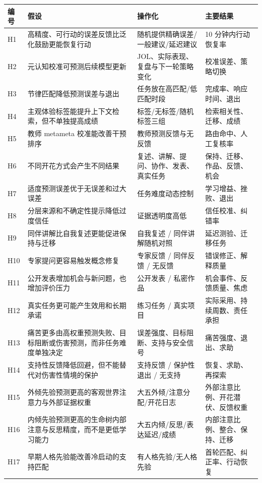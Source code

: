 \documentclass[UTF8,a4paper,11pt]{ctexart}
\begin{document}
\begin{center}
\begin{longtable}{@{}p{1.4cm}p{4.5cm}p{5.2cm}p{3.4cm}@{}}
\toprule
\textbf{编号} & \textbf{假设} & \textbf{操作化} & \textbf{主要结果} \\
\midrule
H1 & 高精度、可行动的误差反馈比泛化鼓励更能恢复行动 & 随机提供精确误差/一般建议/延迟建议 & 10 分钟内行动恢复率 \\
H2 & 元认知校准可预测后续模型更新 & JOL、实际表现、复盘与下一轮策略变化 & 校准误差、策略切换 \\
H3 & 节律匹配降低预测误差与退出 & 任务放在高匹配/低匹配时段 & 完成率、响应时间、退出 \\
H4 & 主观体验标签能提升上下文检索，但不单独提高成绩 & 标签/无标签/随机标签三组 & 检索相关性、迁移、成绩 \\
H5 & 教师 metameta 校准能改善干预排序 & 教师预测反馈与无反馈 & 路由命中、人工复核率 \\
H6 & 不同开花方式会产生不同结果 & 复述、讲解、提问、协作、发表、真实任务 & 保持、迁移、作品、反馈、机会 \\
H7 & 适度预测误差优于无误差和过大误差 & 任务难度动态控制 & 学习增益、挫败、退出 \\
H8 & 分层来源和不确定性提示降低过度信任 & 证据透明度高低 & 信任校准、纠错率 \\
H9 & 同伴讲解比自我复述更能促进保持与迁移 & 自我复述 / 同伴讲解随机对照 & 延迟测验、迁移任务 \\
H10 & 专家提问更容易触发概念修复 & 专家反馈 / 同伴反馈 / 无反馈 & 错误修正、解释质量 \\
H11 & 公开发表增加机会与新问题，也增加评价压力 & 公开发表 / 私密作品 & 机会事件、反馈质量、焦虑 \\
H12 & 真实任务更可能产生效用和长期承诺 & 练习任务 / 真实项目 & 实际采用、持续周数、责任承担 \\
H13 & 痛苦更多由高权重预测失败、目标阻断或伤害预测，而非任务难度单独决定 & 误差强度、目标阻断、支持与安全信号 & 痛苦强度、退出、求助 \\
H14 & 支持性反馈降低回避，但不能替代对伤害性情境的保护 & 支持反馈 / 保护性退出 / 无支持 & 恢复、求助、再探索 \\
H15 & 外倾先验预测更高的客观世界注意力与外部证据权重 & 大五外倾/注意分配/开花日志 & 外部注意比例、开花潜伏、反馈权重 \\
H16 & 内倾先验预测更高的生命树内部注意与反思精度，而不是更低学习能力 & 大五内倾/反思/表达延迟/成绩 & 内部注意比例、整合、保持、迁移 \\
H17 & 早期人格先验能改善冷启动的支持匹配 & 有人格先验/无人格先验 & 首轮匹配、纠正率、行动恢复 \\

\end{longtable}
\end{center}
\end{document}
